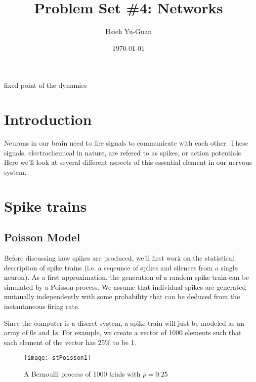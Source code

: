 

\pagestyle{fancy} 
\rfoot{\thepage}
\cfoot{}
\lfoot{~\theauthor}
\renewcommand{\headrulewidth}{0.4pt}
\renewcommand{\footrulewidth}{0.4pt}


\title{Problem Set \#4: Networks \vspace{-0.5em}}
\author{Hsieh Yu-Guan}
\date{\today}
\maketitle

\thispagestyle{fancy}


\iffalse

fixed point of the dynamics

\section*{Introduction}

Neurons in our brain need to fire signals to communicate with each other. 
These signals, electrochemical in nature, are refered to as spikes, or action
potentials. Here we'll look at several different aspects of this essential
element in our nervous system.


\section{Spike trains}

\subsection{Poisson Model}

Before discussing how spikes are produced, we'll first work on the
statistical description of spike trains (i.e. a seqeunce of spikes and 
silences from a single neuron). As a first approximation, the generation of 
a random spike train can be simulated by a Poisson process. We assume that
individual spikes are generated mutaually independently with some probability 
that can be deduced from the instantaneous firing rate. 

Since the computer is a discret system, a spike train will just be modeled as
an array of 0s and 1s. For example, we create a vector of 1000 elements 
such that each element of the vector has 25\% to be 1.

\begin{figure}[H]
  \centering
  \texttt{[image: stPoisson1]}
  \caption{A Bernoulli process of 1000 trials with $p = 0.25$}
\end{figure}

